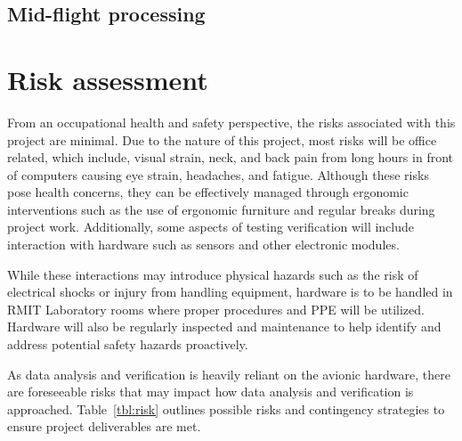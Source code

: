 \subsection{Mid-flight processing}

\section{Risk assessment}
From an occupational health and safety perspective, the risks associated with this project are minimal. Due to the nature of this project, most risks will be office related, which include, visual strain, neck, and back pain from long hours in front of computers causing eye strain, headaches, and fatigue. Although these risks pose health concerns, they can be effectively managed through ergonomic interventions such as the use of ergonomic furniture and regular breaks during project work. Additionally, some aspects of testing verification will include interaction with hardware such as sensors and other electronic modules. 

While these interactions may introduce physical hazards such as the risk of electrical shocks or injury from handling equipment, hardware is to be handled in RMIT Laboratory rooms where proper procedures and PPE will be utilized. Hardware will also be regularly inspected and maintenance to help identify and address potential safety hazards proactively.  

As data analysis and verification is heavily reliant on the avionic hardware, there are foreseeable risks that may impact how data analysis and verification is approached. Table~\ref{tbl:risk} outlines possible risks and contingency strategies to ensure project deliverables are met.  

